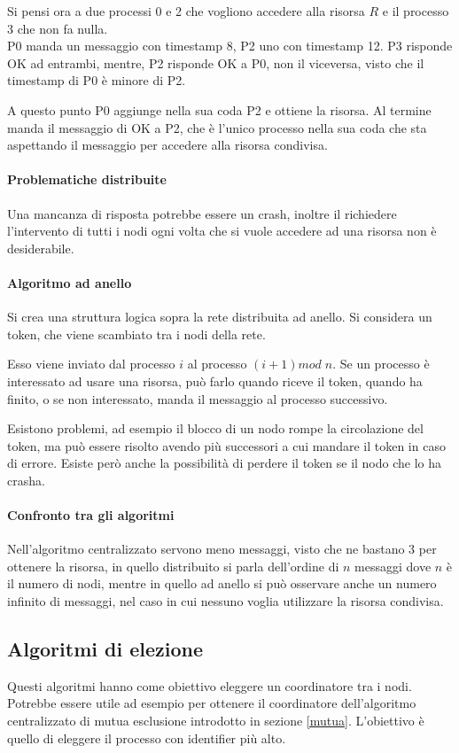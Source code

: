 Si pensi ora a due processi 0 e 2 che vogliono accedere 
alla risorsa $R$ e il processo 3 che non fa nulla.\\
P0 manda un messaggio con timestamp 8, P2 uno con timestamp 12.
P3 risponde OK ad entrambi, mentre, P2 risponde OK a P0, 
non il viceversa, visto che il timestamp di P0 è minore di P2.

A questo punto P0 aggiunge nella sua coda P2 e ottiene la 
risorsa. Al termine manda il messaggio di OK a P2, che è l'unico 
processo nella sua coda che sta aspettando il messaggio 
per accedere alla risorsa condivisa.

\paragraph{Problematiche distribuite}
Una mancanza di risposta potrebbe essere un crash, 
inoltre il richiedere l'intervento di tutti 
i nodi ogni volta che si vuole accedere ad una risorsa non è
desiderabile.

\paragraph{Algoritmo ad anello}
Si crea una struttura logica sopra la rete distribuita ad anello.
Si considera un token, che viene scambiato tra i nodi della rete.

Esso viene inviato dal processo $i$ al processo $(i+1)\mathit{mod\;}n$.
Se un processo è interessato ad usare una risorsa, può farlo 
quando riceve il token, quando ha finito, o se non interessato, 
manda il messaggio al processo successivo.

Esistono problemi, ad esempio il blocco di un nodo 
rompe la circolazione del token, ma può essere risolto avendo più 
successori a cui mandare il token in caso di errore. Esiste però 
anche la possibilità di perdere il token se il nodo che lo ha crasha.

\paragraph{Confronto tra gli algoritmi}
Nell'algoritmo centralizzato servono meno messaggi, visto che ne bastano 
3 per ottenere la risorsa, in quello distribuito si parla 
dell'ordine di $n$ messaggi dove $n$ è il numero di nodi, 
mentre in quello ad anello si può osservare anche un numero 
infinito di messaggi, nel caso in cui nessuno voglia utilizzare 
la risorsa condivisa.

\subsection{Algoritmi di elezione}
Questi algoritmi hanno come obiettivo eleggere un coordinatore 
tra i nodi. 
Potrebbe essere utile ad esempio per ottenere il coordinatore dell'algoritmo 
centralizzato di mutua esclusione introdotto in sezione \vref{mutua}.
L'obiettivo è quello di eleggere il processo con identifier più alto.

